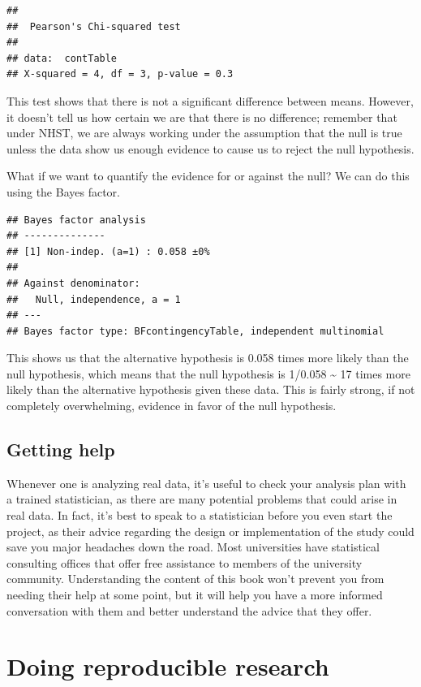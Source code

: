 \documentclass[
  12pt,
]{book}
\begin{document}
\begin{verbatim}
## 
##  Pearson's Chi-squared test
## 
## data:  contTable
## X-squared = 4, df = 3, p-value = 0.3
\end{verbatim}

This test shows that there is not a significant difference between means. However, it doesn't tell us how certain we are that there is no difference; remember that under NHST, we are always working under the assumption that the null is true unless the data show us enough evidence to cause us to reject the null hypothesis.

What if we want to quantify the evidence for or against the null? We can do this using the Bayes factor.

\begin{verbatim}
## Bayes factor analysis
## --------------
## [1] Non-indep. (a=1) : 0.058 ±0%
## 
## Against denominator:
##   Null, independence, a = 1 
## ---
## Bayes factor type: BFcontingencyTable, independent multinomial
\end{verbatim}

This shows us that the alternative hypothesis is 0.058 times more likely than the null hypothesis, which means that the null hypothesis is 1/0.058 \textasciitilde{} 17 times more likely than the alternative hypothesis given these data. This is fairly strong, if not completely overwhelming, evidence in favor of the null hypothesis.

\hypertarget{getting-help}{%
\section{Getting help}\label{getting-help}}

Whenever one is analyzing real data, it's useful to check your analysis plan with a trained statistician, as there are many potential problems that could arise in real data. In fact, it's best to speak to a statistician before you even start the project, as their advice regarding the design or implementation of the study could save you major headaches down the road. Most universities have statistical consulting offices that offer free assistance to members of the university community. Understanding the content of this book won't prevent you from needing their help at some point, but it will help you have a more informed conversation with them and better understand the advice that they offer.

\hypertarget{doing-reproducible-research}{%
\chapter{Doing reproducible research}\label{doing-reproducible-research}}
\end{document}
